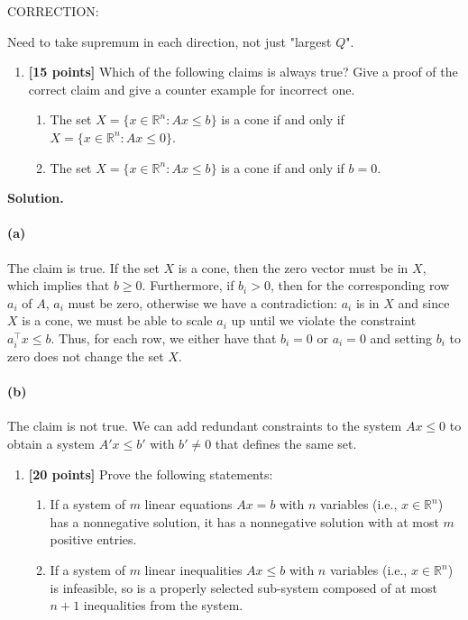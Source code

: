 \documentclass[11pt,letterpaper]{article}
\theoremstyle{definition}
\newcommand{\reals}{\mathbb{R}}
\newcommand{\solution}{\medskip\noindent\textbf{Solution.}\par\medskip}
\begin{document}
CORRECTION:

Need to take supremum in each direction, not just "largest $Q$".

\begin{enumerate}[resume]
\item \textbf{[15 points]} Which of the following claims is always true? Give a proof of the correct claim and give a counter example for incorrect one.
\begin{enumerate}
\item The set $X = \{x\in\reals^n : Ax\leq b\}$ is a cone if and only if $X = \{x\in\reals^n : Ax\leq 0\}$.
\item The set $X = \{x\in\reals^n : Ax\leq b\}$ is a cone if and only if $b = 0$.
\end{enumerate}
\end{enumerate}

\solution

\paragraph{(a)} The claim is true.
If the set $X$ is a cone, then the zero vector must be in $X$, which implies that $b\geq 0$.
Furthermore, if $b_i>0$, then for the corresponding row $a_i$ of $A$, $a_i$ must be zero, otherwise we have a contradiction: $a_i$ is in $X$ and since $X$ is a cone, we must be able to scale $a_i$ up until we violate the constraint $a_i^\top x \leq b$.
Thus, for each row, we either have that $b_i = 0$ or $a_i = 0$ and setting $b_i$ to zero does not change the set $X$.

\paragraph{(b)} The claim is not true. 
We can add redundant constraints to the system $Ax\leq 0$ to obtain a system $A'x\leq b'$ with $b'\neq 0$ that defines the same set.

\begin{enumerate}[resume]
\item \textbf{[20 points]} Prove the following statements:
\begin{enumerate}
\item If a system of $m$ linear equations $Ax = b$ with $n$ variables (i.e., $x\in\reals^n$) has a nonnegative solution, it has a nonnegative solution with at most $m$ positive entries.
\item If a system of $m$ linear inequalities $Ax\leq b$ with $n$ variables (i.e., $x\in\reals^n$) is infeasible, so is a properly selected sub-system composed of at most $n+1$ inequalities from the system.
\end{enumerate}
\end{enumerate}
\end{document}
